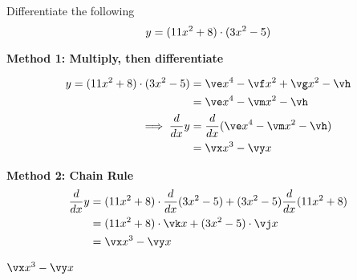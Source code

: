 

\MULTIPLY\va\vc\ve
\MULTIPLY\va\vd\vf
\MULTIPLY\vb\vc\vg
\MULTIPLY\vb\vd\vh

\SUBTRACT\vf\vg\vm
\MULTIPLY{}\vx
\MULTIPLY{}\vy

\MULTIPLY{}\vj
\MULTIPLY{}\vk

\question[1] Differentiate the following 
  \[ y = (11 x^2 + 8)\cdot(3 x^2 -5) \]

\watchout

\begin{solution}[\halfpage]
  \textbf{Method 1: Multiply, then differentiate}

	\begin{align}
    y = (\va x^2+\vb)\cdot (\vc x^2 - \vd) &= \ve x^4 -\vf x^2 + \vg x^2 -\vh \\
    & = \ve x^4 - \vm x^2 - \vh \\
    \implies \dfrac{d}{dx}y &= \dfrac{d}{dx}(\ve x^4 - \vm x^2 - \vh ) \\
      &= \vx x^3 - \vy x
	\end{align}

  \textbf{Method 2: Chain Rule} 
  \begin{align}
    \dfrac{d}{dx} y &= (\va x^2 + \vb)\cdot\dfrac{d}{dx}(\vc x^2 - \vd) + (\vc x^2 - \vd)\dfrac{d}{dx}(\va x^2 + \vb) \\
     &= (\va x^2 + \vb)\cdot\vk x + (\vc x^2-\vd)\cdot \vj x \\
     &= \vx x^3-\vy x
  \end{align}
\end{solution}

\ifprintanswers\begin{codex}$\vx x^3-\vy x$\end{codex}\fi

